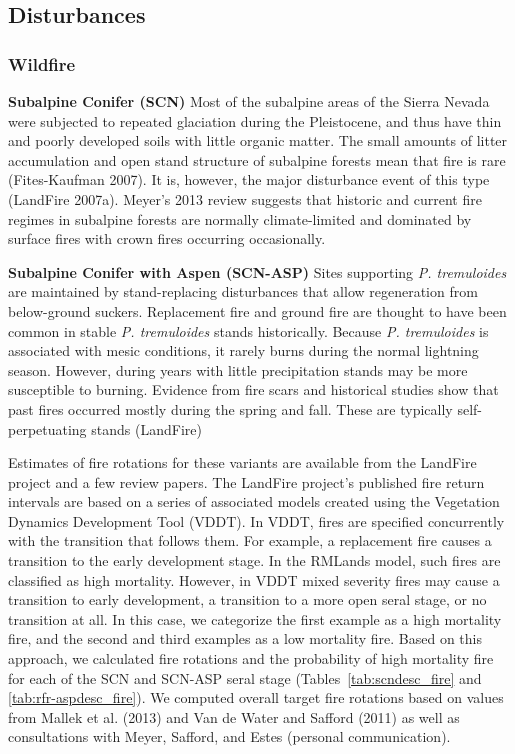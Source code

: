 \subsection*{Disturbances}

\subsubsection*{Wildfire}
\textbf{Subalpine Conifer (SCN)} Most of the subalpine areas of the Sierra Nevada were subjected to repeated glaciation during the Pleistocene, and thus have thin and poorly developed soils with little organic matter. The small amounts of litter accumulation and open stand structure of subalpine forests mean that fire is rare (Fites-Kaufman 2007). It is, however, the major disturbance event of this type (LandFire 2007a). Meyer’s 2013 review suggests that historic and current fire regimes in subalpine forests are normally climate-limited and dominated by surface fires with crown fires occurring occasionally.  

\textbf{Subalpine Conifer with Aspen (SCN-ASP)} Sites supporting \emph{P. tremuloides} are maintained by stand-replacing disturbances that allow regeneration from below-ground suckers. Replacement fire and ground fire are thought to have been common in stable \emph{P. tremuloides} stands historically. Because \emph{P. tremuloides} is associated with mesic conditions, it rarely burns during the normal lightning season. However, during years with little precipitation stands may be more susceptible to burning. Evidence from fire scars and historical studies show that past fires occurred mostly during the spring and fall. These are typically self-perpetuating stands (LandFire)

Estimates of fire rotations for these variants are available from the LandFire project and a few review papers. The LandFire project’s published fire return intervals are based on a series of associated models created using the Vegetation Dynamics Development Tool (VDDT). In VDDT, fires are specified concurrently with the transition that follows them. For example, a replacement fire causes a transition to the early development stage. In the RMLands model, such fires are classified as high mortality. However, in VDDT mixed severity fires may cause a transition to early development, a transition to a more open seral stage, or no transition at all. In this case, we categorize the first example as a high mortality fire, and the second and third examples as a low mortality fire. Based on this approach, we calculated fire rotations and the probability of high mortality fire for each of the SCN and SCN-ASP seral stage (Tables~\ref{tab:scndesc_fire} and \ref{tab:rfr-aspdesc_fire}). We computed overall target fire rotations based on values from Mallek et al. (2013) and Van de Water and Safford (2011) as well as consultations with Meyer, Safford, and Estes (personal communication). 





